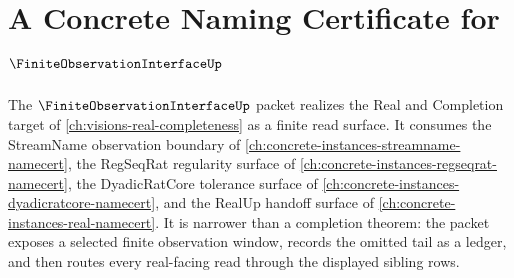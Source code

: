 \chapter{A Concrete Naming Certificate for $\FiniteObservationInterfaceUp$}
\label{ch:concrete-instances-finite-observation-interface-namecert}

The $\FiniteObservationInterfaceUp$ packet realizes the Real and Completion target of \autoref{ch:visions-real-completeness} as a finite read surface. It consumes the StreamName observation boundary of \autoref{ch:concrete-instances-streamname-namecert}, the RegSeqRat regularity surface of \autoref{ch:concrete-instances-regseqrat-namecert}, the DyadicRatCore tolerance surface of \autoref{ch:concrete-instances-dyadicratcore-namecert}, and the RealUp handoff surface of \autoref{ch:concrete-instances-real-namecert}. It is narrower than a completion theorem: the packet exposes a selected finite observation window, records the omitted tail as a ledger, and then routes every real-facing read through the displayed sibling rows.

